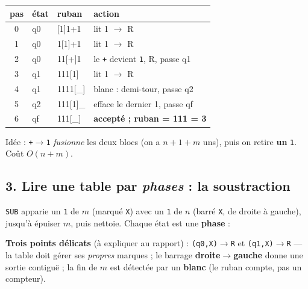 \documentclass[11pt,a4paper]{scrartcl}
\begin{document}
\begin{exemple}[Trace pas-à-pas — \texttt{2+1 = 3}]
\begin{center}\small\ttfamily
\begin{tabular}{@{}clll@{}}
\toprule
\rmfamily pas & \rmfamily état & \rmfamily ruban & \rmfamily action\\\midrule
0 & q0 & [1]1+1 & lit 1 $\to$ R\\
1 & q0 & 1[1]+1 & lit 1 $\to$ R\\
2 & q0 & 11[+]1 & \rmfamily le \texttt{+} devient \texttt{1}, R, passe q1\\
3 & q1 & 111[1] & lit 1 $\to$ R\\
4 & q1 & 1111[\_] & \rmfamily blanc : demi-tour, passe q2\\
5 & q2 & 111[1]\_ & \rmfamily efface le dernier 1, passe qf\\
6 & qf & 111[\_] & \rmfamily \bfseries accepté ; ruban = 111 = 3\\
\bottomrule
\end{tabular}
\end{center}
Idée : \texttt{+}$\to$\texttt{1} \emph{fusionne} les deux blocs (on a $n{+}1{+}m$ uns),
puis on retire \textbf{un} \texttt{1}. Coût $O(n{+}m)$.
\end{exemple}

\subsection*{3. Lire une table par \emph{phases} : la soustraction}
\texttt{SUB} apparie un \texttt{1} de $m$ (marqué \texttt{X}) avec un \texttt{1} de $n$
(barré \texttt{X}, de droite à gauche), jusqu'à épuiser $m$, puis nettoie. Chaque état
est une \textbf{phase} :

\begin{center}
\end{center}
\noindent \textbf{Trois points délicats} (à expliquer au rapport) : \texttt{(q0,X)$\to$R}
et \texttt{(q1,X)$\to$R} — la table doit gérer ses \emph{propres} marques ; le barrage
\textbf{droite$\to$gauche} donne une sortie contiguë ; la fin de $m$ est détectée par un
\textbf{blanc} (le ruban compte, pas un compteur).
\end{document}
